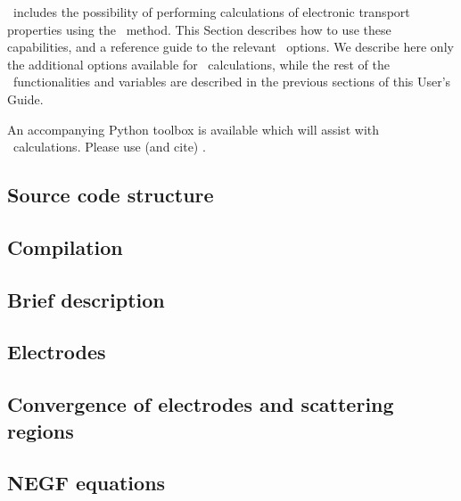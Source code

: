\newcommand\Nelec{N_{\mathfrak{E}}}


\siesta\ includes the possibility of performing calculations of
electronic transport properties using the \tsiesta\ method. This
Section describes how to use these
capabilities, and a reference guide to the relevant \fdflib\
options. We describe here only the additional options available for
\tsiesta\ calculations, while the rest of the \siesta\ functionalities
and variables are described in the previous sections of this User's
Guide.

An accompanying Python toolbox is available which will assist with
\tsiesta\ calculations. Please use (and cite) \sisl\cite{sisl}.


\subsection{Source code structure}



\subsection{Compilation}



\subsection{Brief description}
\label{sec:transiesta:description}



\subsection{Electrodes}



\subsection{Convergence of electrodes and scattering regions}



\subsection{NEGF equations}
\label{sec:negf-equations}

